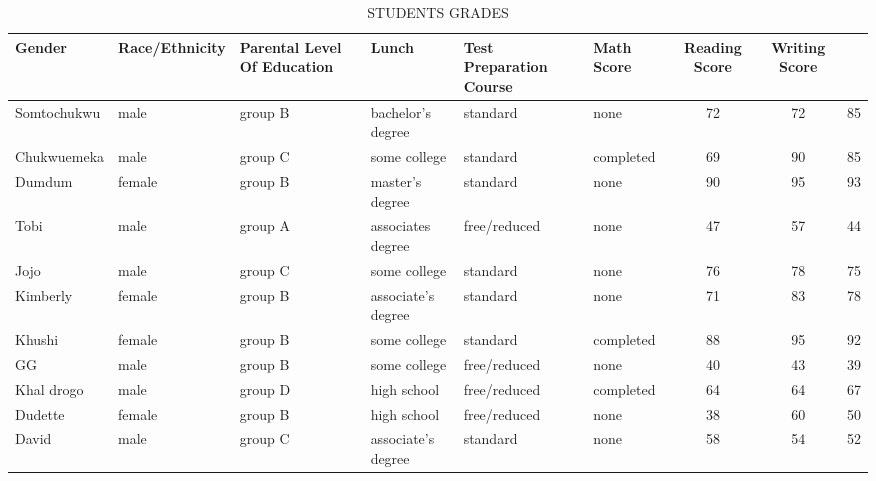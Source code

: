 \documentclass{article}
\begin{document}
	\begin{table}[h!]
	
		\begin{center}
			
				 
			\caption{STUDENTS GRADES}
			\label{tab:table1}
			
	    \begin{tabular}{|l|l|l|l|l|l|c|c|c|}
	    \hline
	    	\textbf\cellcolor{blue!50}\textcolor{white!25}{Gender} & \textbf{Race/Ethnicity} & \textbf{Parental Level Of Education} & \textbf{Lunch} & \textbf\cellcolor{blue!100}\textcolor{white!25}{Test Preparation Course}& \textbf\cellcolor{blue!100}\textcolor{white!25}{Math Score}&\textbf\cellcolor{blue!100}\textcolor{white!25}{Reading Score} &\textbf\cellcolor{blue!100}\textcolor{white!25}{Writing Score}\\
	    \hline
	    Somtochukwu&male&group B&bachelor's degree&standard&none&72&72&85\\
	    \hline
	    Chukwuemeka&male&group C&some college&standard&completed&69&90&85\\
	    \hline
	    Dumdum&female&group B&master's degree&standard&none&90&95&93\\
	    \hline
	    Tobi&male&group A&associates degree&free/reduced&none&47&57&44\\
	    \hline
	    Jojo&male&group C&some college&standard&none&76&78&75\\
	    \hline
	    Kimberly&female&group B&associate's degree&standard&none&71&83&78\\
	    \hline
	    Khushi&female&group B&some college&standard&completed&88&95&92\\
	    \hline
	    GG&male&group B&some college&free/reduced&none&40&43&39\\
	    \hline
	    Khal drogo&male&group D&high school&free/reduced&completed&64&64&67\\
	    \hline
	    Dudette&female&group B&high school&free/reduced&none&38&60&50\\
	    \hline
	    David&male&group C&associate's degree&standard&none&58&54&52\\
	    \hline
	
	    \end{tabular}
              
		
			\end{center}
		
	
	\end{table}
      	
\end{document}
